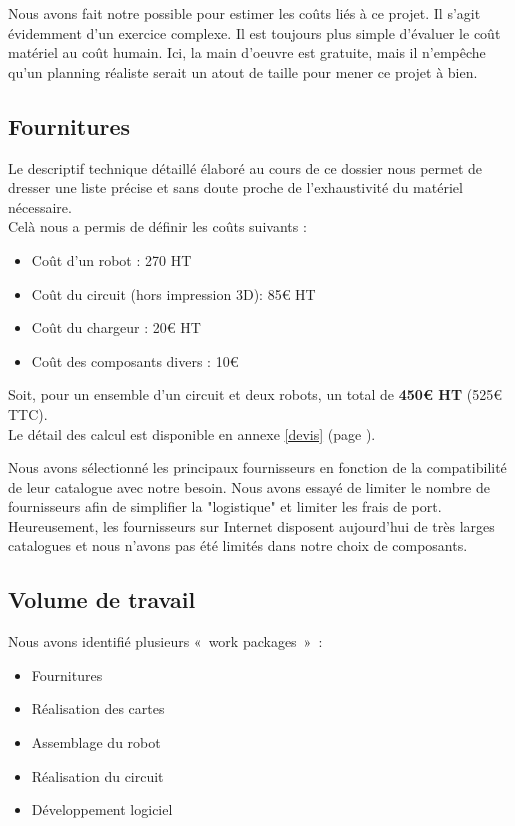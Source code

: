  Nous avons fait notre possible pour estimer les coûts liés à ce projet. Il s'agit évidemment d'un exercice complexe.
 Il est toujours plus simple d'évaluer le coût matériel au coût humain. Ici, la main d'oeuvre est gratuite, mais il n'empêche qu'un planning réaliste serait un atout de taille pour mener ce projet à bien.

 \subsection{Fournitures}

 	Le descriptif technique détaillé élaboré au cours de ce dossier nous permet de dresser une liste précise et sans doute proche de l'exhaustivité du matériel nécessaire.\\

 	Celà nous a permis de définir les coûts suivants :
 	\begin{itemize}
 		\item Coût d'un robot : 270 HT
 		\item Coût du circuit (hors impression 3D): 85€ HT
 		\item Coût du chargeur : 20€ HT
 		\item Coût des composants divers : 10€
 	\end{itemize}

 	\vspace{15pt}

 	Soit, pour un ensemble d'un circuit et deux robots, un total de \textbf{450€ HT} (525€ TTC).\\

 	Le détail des calcul est disponible en annexe \ref{devis} (page \pageref{devis}).



 	Nous avons sélectionné les principaux fournisseurs en fonction de la compatibilité de leur catalogue avec notre besoin.
 	Nous avons essayé de limiter le nombre de fournisseurs afin de simplifier la "logistique" et limiter les frais de port.\\

 	Heureusement, les fournisseurs sur Internet disposent aujourd'hui de très larges catalogues et nous n'avons pas été limités dans notre choix de composants.

 \subsection{Volume de travail}

 	Nous avons identifié plusieurs « work packages » :\\
 	\begin{itemize}
 		\item Fournitures
 		\item Réalisation des cartes
 		\item Assemblage du robot
 		\item Réalisation du circuit
 		\item Développement logiciel
 	\end{itemize}

